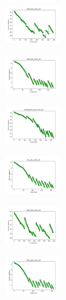 \begin{figure}[H]
\begin{subfigure}
        \centering
        \includegraphics[width=0.234\textwidth]{img/ils/ecoli_set_const_20_589741062_cost.png}
    \end{subfigure}
    \hfill
    \begin{subfigure}
        \centering
        \includegraphics[width=0.234\textwidth]{img/ils/rand_set_const_20_589741062_cost.png}
    \end{subfigure}
    \hfill
    \begin{subfigure}
        \centering
        \includegraphics[width=0.234\textwidth]{img/ils/newthyroid_set_const_20_589741062_cost.png}
    \end{subfigure}
    \hfill
    \begin{subfigure}
        \centering
        \includegraphics[width=0.234\textwidth]{img/ils/iris_set_const_20_277451237_cost.png}
    \end{subfigure}
    \hfill
    \begin{subfigure}
        \centering
        \includegraphics[width=0.234\textwidth]{img/ils/ecoli_set_const_20_277451237_cost.png}
    \end{subfigure}
    \hfill
    \begin{subfigure}
        \centering
        \includegraphics[width=0.234\textwidth]{img/ils/rand_set_const_20_277451237_cost.png}

\end{subfigure}
\end{figure}

